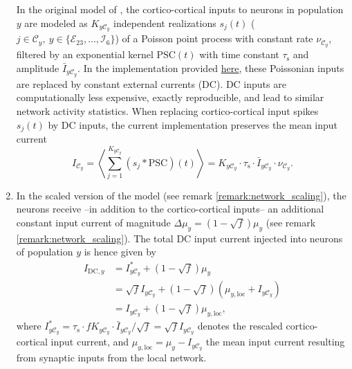 \documentclass[10pt,a4paper,twoside,american]{article}
\theoremstyle{definitionstyle}
\newcommand{\tauS}{\tau_\text{s}}
\begin{document}
\begin{enumerate}
  In the original model of \citet{Potjans14}, the cortico-cortical inputs to neurons in population $y$ are modeled as $K_{y\mathcal{C}_{y}}$ independent realizations $s_j(t)$ ($j\in\mathcal{C}_y,\ y\in \{\mathcal{E}_{23},\ldots,\mathcal{I}_{6}\}$) of a Poisson point process with constant rate $\nu_{\mathcal{C}_y}$, filtered by an exponential kernel $\text{PSC}(t)$ with time constant $\tauS$ and amplitude $\bar{I}_{y\mathcal{C}_y}$.   
  In the implementation provided \href{https://github.com/INM-6/microcircuit-PD14-model}{here}, these Poissonian inputs are replaced by constant external currents (DC).
  DC inputs are computationally less expensive, exactly reproducible, and lead to similar network activity statistics.
  When replacing cortico-cortical input spikes $s_j(t)$ by DC inputs, the current implementation preserves the mean input current
  \begin{equation}
    I_{\mathcal{C}_y}
    = \left\langle \sum_{j=1}^{K_{y\mathcal{C}_y}} \left(s_j*\text{PSC}\right)(t) \right\rangle
    = K_{y\mathcal{C}_y} \cdot \tauS \cdot \bar{I}_{y\mathcal{C}_y} \cdot \nu_{\mathcal{C}_y} .
  \end{equation}
\item \label{remark:dc_scaling_constraints}
  In the scaled version of the model (see remark \ref{remark:network_scaling}), the neurons receive --in addition to the cortico-cortical inputs-- an additional constant input current of magnitude $\Delta\mu_y = ( 1 - \sqrt{f}) \mu_y$ (see remark \ref{remark:network_scaling}).
  The total DC input current injected into neurons of population $y$ is hence given by
  \begin{equation}
    \label{eq:dc_magnitude_rescaled}
    \begin{aligned}
    I_{\text{DC},y}
    & = I_{y\mathcal{C}_y}^* + \left( 1 - \sqrt{f} \right) \mu_y\\
    & = \sqrt{f} I_{y\mathcal{C}_y} + \left( 1 - \sqrt{f} \right) \left( \mu_{y,\text{loc}} + I_{y\mathcal{C}_y}\right) \\
    & = I_{y\mathcal{C}_y} + \left( 1 - \sqrt{f} \right) \mu_{y,\text{loc}}
    ,      
    \end{aligned}
  \end{equation}
  where $I_{y\mathcal{C}_y}^* = \tauS \cdot fK_{y\mathcal{C}_y} \cdot \bar{I}_{y\mathcal{C}_y}/\sqrt{f} = \sqrt{f} I_{y\mathcal{C}_y}$ denotes the rescaled cortico-cortical input current, and  $\mu_{y,\text{loc}}=\mu_y - I_{y\mathcal{C}_y}$ the mean input current resulting from synaptic inputs from the local network.

\end{enumerate}
\end{document}
